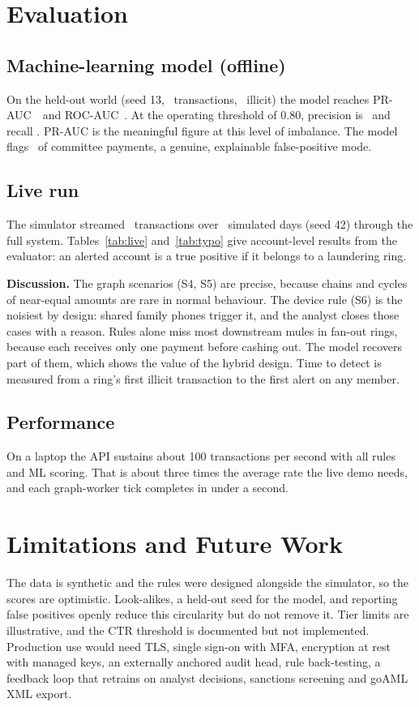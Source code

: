 \documentclass[conference,10pt]{IEEEtran}
\begin{document}
\section{Evaluation}

\subsection{Machine-learning model (offline)}
On the held-out world (seed 13, \ResMLTestTxns\ transactions, \ResMLTestIllicit\ illicit) the model
reaches PR-AUC~\ResMLPRAUC\ and ROC-AUC~\ResMLROC. At the operating threshold of 0.80, precision is
\ResMLPrec\ and recall \ResMLRec. PR-AUC is the meaningful figure at this level of imbalance. The
model flags \ResMLCommittee\ of committee payments, a genuine, explainable false-positive mode.

\subsection{Live run}
The simulator streamed \ResTxns\ transactions over \ResDays\ simulated days (seed 42) through the
full system. Tables~\ref{tab:live} and~\ref{tab:typo} give account-level results from the evaluator:
an alerted account is a true positive if it belongs to a laundering ring.



\textbf{Discussion.} The graph scenarios (S4, S5) are precise, because chains and cycles of
near-equal amounts are rare in normal behaviour. The device rule (S6) is the noisiest by design:
shared family phones trigger it, and the analyst closes those cases with a reason. Rules alone miss
most downstream mules in fan-out rings, because each receives only one payment before cashing out.
The model recovers part of them, which shows the value of the hybrid design. Time to detect is
measured from a ring's first illicit transaction to the first alert on any member.

\subsection{Performance}
On a laptop the API sustains about 100 transactions per second with all rules and ML scoring.
That is about three times the average rate the live demo needs, and each graph-worker tick completes in under a
second.

\section{Limitations and Future Work}
The data is synthetic and the rules were designed alongside the simulator, so the scores are
optimistic. Look-alikes, a held-out seed for the model, and reporting false positives openly reduce
this circularity but do not remove it. Tier limits are illustrative, and the CTR threshold is
documented but not implemented. Production use would need TLS, single sign-on with MFA, encryption
at rest with managed keys, an externally anchored audit head, rule back-testing, a feedback loop
that retrains on analyst decisions, sanctions screening and goAML XML export.
\end{document}
